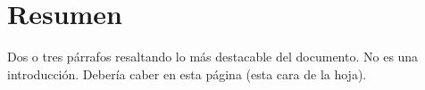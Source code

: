 
\chapter{Resumen}

Dos o tres párrafos resaltando lo más destacable del documento. No es una
introducción. Debería caber en esta página (esta cara de la hoja).

